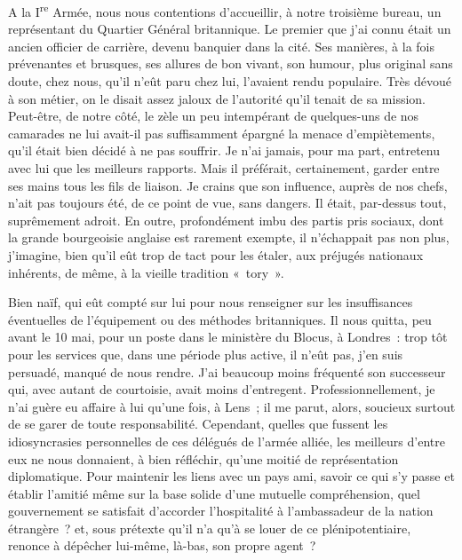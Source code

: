 \documentclass[french,twoside]{book} %
\begin{document}
A la I\textsuperscript{re} Armée, nous nous contentions d’accueillir, à notre troisième bureau, un représentant du Quartier Général britannique. Le premier que j’ai connu était un ancien officier de carrière, devenu banquier   dans la cité. Ses manières, à la fois prévenantes et brusques, ses allures de bon vivant, son humour, plus original sans doute, chez nous, qu’il n’eût paru chez lui, l’avaient rendu populaire. Très dévoué à son métier, on le disait assez jaloux de l’autorité qu’il tenait de sa mission. Peut-être, de notre côté, le zèle un peu intempérant de quelques-uns de nos camarades ne lui avait-il pas suffisamment épargné la menace d’empiètements, qu’il était bien décidé à ne pas souffrir. Je n’ai jamais, pour ma part, entretenu avec lui que les meilleurs rapports. Mais il préférait, certainement, garder entre ses mains tous les fils de liaison. Je crains que son influence, auprès de nos chefs, n’ait pas toujours été, de ce point de vue, sans dangers. Il était, par-dessus tout, suprêmement adroit. En outre, profondément imbu des partis pris sociaux, dont la grande bourgeoisie anglaise est rarement exempte, il n’échappait pas non plus, j’imagine, bien qu’il eût trop de tact pour les étaler, aux préjugés nationaux inhérents, de même, à la vieille tradition « tory ».\par
Bien naïf, qui eût compté sur lui pour nous renseigner sur les insuffisances éventuelles de l’équipement ou des méthodes britanniques. Il nous quitta, peu avant le 10 mai, pour un poste dans le ministère du Blocus, à Londres : trop tôt pour les services que, dans une période plus active, il n’eût pas, j’en suis persuadé, manqué de nous rendre. J’ai beaucoup moins fréquenté son successeur qui, avec autant de courtoisie, avait moins d’entregent. Professionnellement, je n’ai guère eu affaire à lui qu’une fois, à Lens ; il me parut, alors, soucieux surtout de se garer de toute responsabilité. Cependant, quelles que fussent les idiosyncrasies personnelles de ces délégués de l’armée alliée, les meilleurs d’entre eux ne nous donnaient, à bien réfléchir, qu’une moitié de représentation diplomatique. Pour maintenir les liens avec un pays ami, savoir ce qui s’y passe et établir l’amitié même sur la base solide d’une mutuelle   compréhension, quel gouvernement se satisfait d’accorder l’hospitalité à l’ambassadeur de la nation étrangère ? et, sous prétexte qu’il n’a qu’à se louer de ce plénipotentiaire, renonce à dépêcher lui-même, là-bas, son propre agent ?\par
\end{document}
